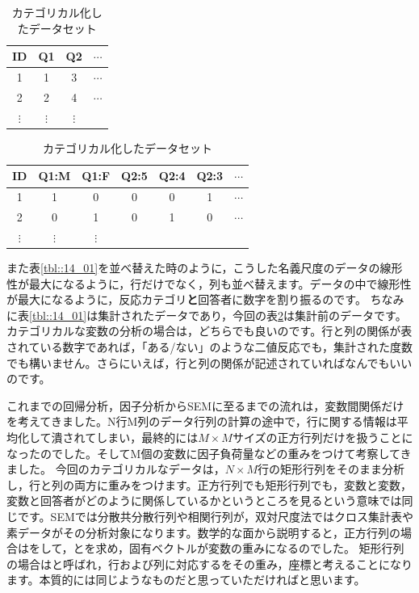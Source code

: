 \documentclass{ltjsbook}
\begin{document}
\begin{table}[h]
	\begin{minipage}[t]{.30\textwidth}
	  \begin{center}
		\begin{tabular}{cccc}
			ID & Q1 & Q2 & $\cdots$ \\\hline
			1 & 1  & 3 & $\cdots$ \\
			2 & 2  & 4 & $\cdots$ \\
			$\vdots$ & $\vdots$  & $\vdots$ &  \\\hline
		\end{tabular}
	  \end{center}
	  \caption{一般的なデータセット}
	  \label{tbl::14_04}
	\end{minipage}
	\hfill
	\begin{minipage}[t]{.60\textwidth}
	  \begin{center}
		\begin{tabular}{ccccccc}
			ID & Q1:M & Q1:F & Q2:5 & Q2:4 & Q2:3 &$\cdots$ \\\hline
			1 & 1  & 0 & 0 & 0 & 1  & $\cdots$ \\
			2 & 0  & 1 & 0 & 1 & 0  & $\cdots$ \\
			$\vdots$ & $\vdots $ & $\vdots$ &  \\\hline
		\end{tabular}
	  \end{center}
	  \caption{カテゴリカル化したデータセット}
	  \label{tbl::14_05}
	\end{minipage}
  \end{table}

また表\ref{tbl::14_01}を並べ替えた時のように，こうした名義尺度のデータの線形性が最大になるように，行だけでなく，列も並べ替えます。データの中で線形性が最大になるように，反応カテゴリ\textbf{と}回答者に数字を割り振るのです。
ちなみに表\ref{tbl::14_01}は集計されたデータであり，今回の表\ref{tbl::14_05}は集計前のデータです。カテゴリカルな変数の分析の場合は，どちらでも良いのです。行と列の関係が表されている数字であれば，「ある/ない」のような二値反応でも，集計された度数でも構いません。さらにいえば，行と列の関係が記述されていればなんでもいいのです。

これまでの回帰分析，因子分析からSEMに至るまでの流れは，変数間関係だけを考えてきました。N行M列のデータ行列の計算の途中で，行に関する情報は平均化して潰されてしまい，最終的には$M \times M$サイズの正方行列だけを扱うことになったのでした。そしてM個の変数に因子負荷量などの重みをつけて考察してきました。
今回のカテゴリカルなデータは，$N\times M$行の矩形行列をそのまま分析し，行と列の両方に重みをつけます。正方行列でも矩形行列でも，変数と変数，変数と回答者がどのように関係しているかというところを見るという意味では同じです。SEMでは分散共分散行列や相関行列が，双対尺度法ではクロス集計表や素データがその分析対象になります。数学的な面から説明すると，正方行列の場合はをして，とを求め，固有ベクトルが変数の重みになるのでした。
矩形行列の場合はと呼ばれ，行および列に対応するをその重み，座標と考えることになります。本質的には同じようなものだと思っていただければと思います。
\end{document}
